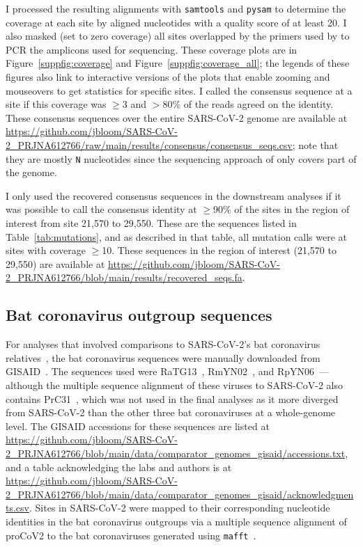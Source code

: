 \documentclass[9pt,twocolumn,twoside]{gsajnl_modified}
\begin{document}
{I processed the resulting alignments with \texttt{samtools} and \texttt{pysam} to determine the coverage at each site by aligned nucleotides with a quality score of at least 20.
I also masked (set to zero coverage) all sites overlapped by the primers used by \citet{wang2020medRxiv} to PCR the amplicons used for sequencing.
These coverage plots are in Figure~\ref{suppfig:coverage} and Figure~\ref{suppfig:coverage_all}; the legends of these figures also link to interactive versions of the plots that enable zooming and mouseovers to get statistics for specific sites.
I called the consensus sequence at a site if this coverage was $\ge$3 and $>$80\% of the reads agreed on the identity.
These consensus sequences over the entire SARS-CoV-2 genome are available at \url{https://github.com/jbloom/SARS-CoV-2_PRJNA612766/raw/main/results/consensus/consensus_seqs.csv}; note that they are mostly \texttt{N} nucleotides since the sequencing approach of \citet{wang2020medRxiv} only covers part of the genome.

I only used the recovered consensus sequences in the downstream analyses if it was possible to call the consensus identity at $\ge$90\% of the sites in the region of interest from site 21,570 to 29,550.
These are the sequences listed in Table~\ref{tab:mutations}, and as described in that table, all mutation calls were at sites with coverage $\ge$10.
These sequences in the region of interest (21,570 to 29,550) are available at \url{https://github.com/jbloom/SARS-CoV-2_PRJNA612766/blob/main/results/recovered_seqs.fa}.

\subsection{Bat coronavirus outgroup sequences}
For analyses that involved comparisons to SARS-CoV-2's bat coronavirus relatives~\citep{lytras2021exploring}, the bat coronavirus sequences were manually downloaded from GISAID~\citep{shu2017gisaid}.
The sequences used were RaTG13~\citep{zhou2020pneumonia}, RmYN02~\citep{zhou2020novel}, and RpYN06~\citep{zhou2021identification}---although the multiple sequence alignment of these viruses to SARS-CoV-2 also contains PrC31~\citep{li2021novel}, which was not used in the final analyses as it more diverged from SARS-CoV-2 than the other three bat coronaviruses at a whole-genome level.
The GISAID accessions for these sequences are listed at \url{https://github.com/jbloom/SARS-CoV-2_PRJNA612766/blob/main/data/comparator_genomes_gisaid/accessions.txt}, and a table acknowledging the labs and authors is at \url{https://github.com/jbloom/SARS-CoV-2_PRJNA612766/blob/main/data/comparator_genomes_gisaid/acknowledgments.csv}.
Sites in SARS-CoV-2 were mapped to their corresponding nucleotide identities in the bat coronavirus outgroups via a multiple sequence alignment of proCoV2 to the bat coronaviruses generated using \texttt{mafft}~\citep{katoh2013mafft}.

}
\end{document}

